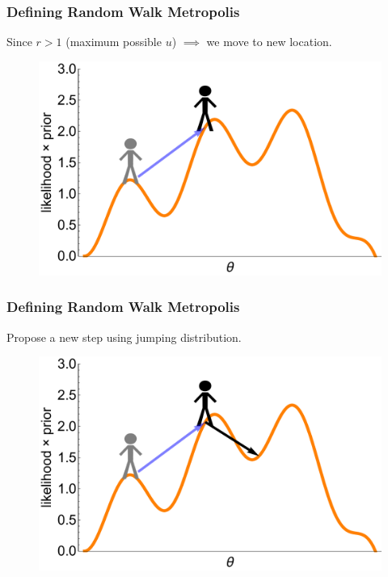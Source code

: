 \documentclass[handout]{beamer}
\begin{document}
\begin{frame}
\frametitle{Defining Random Walk Metropolis}
Since $r > 1$ (maximum possible $u$) $\implies$ we move to new location.

\begin{figure}[ht]
\centerline{\includegraphics[width=1\textwidth]{animations_figures/lec4_metropolisDefinition9.pdf}}
\end{figure}

\end{frame}

\begin{frame}
\frametitle{Defining Random Walk Metropolis}
Propose a new step using jumping distribution.

\begin{figure}[ht]
\centerline{\includegraphics[width=1\textwidth]{animations_figures/lec4_metropolisDefinition10.pdf}}
\end{figure}

\end{frame}
\end{document}
